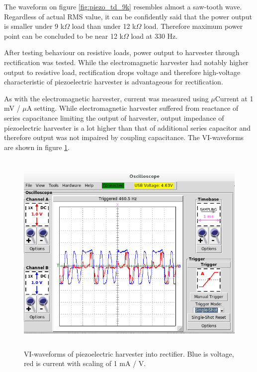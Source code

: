 The waveform on figure \ref{fig:piezo_td_9k} resembles almost a saw-tooth wave. Regardless of actual RMS value, it can be confidently said that the power output is smaller under 9 k$\Omega$ load than under 12 k$\Omega$ load. Therefore maximum power point can be concluded to be near 12 k$\Omega$ load at 330 Hz. 

After testing behaviour on resistive loads, power output to harvester through rectification was tested. While the electromagnetic harvester had notably higher output to resistive load, rectification drops voltage and therefore high-voltage characteristic of piezoelectric harvester is advantageous for rectification. 

As with the electromagnetic harvester, current was measured using $\mu$Current at 1 mV / $\mu$A setting. While electromagnetic harvester suffered from reactance of series capacitance limiting the output of harvester, output impedance of piezoelectric harvester is a lot higher than that of additional series capacitor and therefore output was not impaired by coupling capacitance. The VI-waveforms are shown in figure \ref{fig:piezo_td_vi}. 

\begin{figure}[htb]
\begin{center}
\includegraphics[height=10cm]{images/own_measurement/generator_shaker/piezo_td_vi_330hz_2_3.png}
\end{center}
\caption{\label{fig:piezo_td_vi} VI-waveforms of piezoelectric harvester into rectifier. Blue is voltage, red is current with scaling of 1 mA / V.}
\end{figure}

